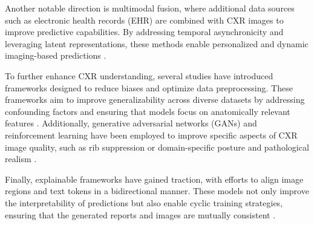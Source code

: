 Another notable direction is multimodal fusion, where additional data sources such as electronic health records (EHR) are combined with CXR images to improve predictive capabilities. By addressing temporal asynchronicity and leveraging latent representations, these methods enable personalized and dynamic imaging-based predictions \cite{yao2024addressing}.

To further enhance CXR understanding, several studies have introduced frameworks designed to reduce biases and optimize data preprocessing. These frameworks aim to improve generalizability across diverse datasets by addressing confounding factors and ensuring that models focus on anatomically relevant features \cite{aslani2022optimising, castro2024padchestgr}. Additionally, generative adversarial networks (GANs) and reinforcement learning have been employed to improve specific aspects of CXR image quality, such as rib suppression or domain-specific posture and pathological realism \cite{han2021ganbased, chen2023finematching}.

Finally, explainable frameworks have gained traction, with efforts to align image regions and text tokens in a bidirectional manner. These models not only improve the interpretability of predictions but also enable cyclic training strategies, ensuring that the generated reports and images are mutually consistent \cite{chen2023finematching}.